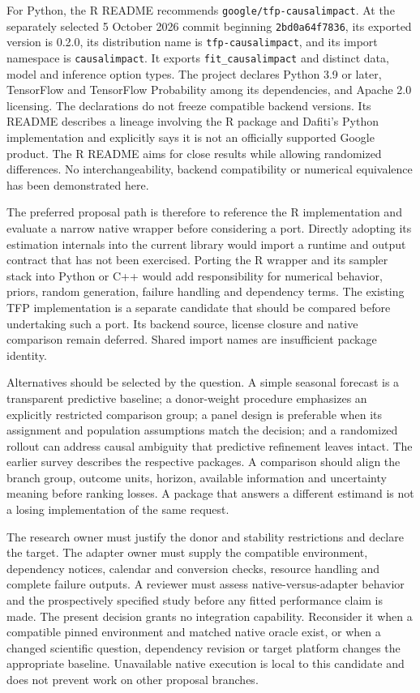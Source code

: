For Python, the R README recommends \texttt{google/tfp-causalimpact}.
At the separately selected 5 October 2026 commit beginning
\texttt{2bd0a64f7836}, its exported version is 0.2.0, its distribution name
is \texttt{tfp-causalimpact}, and its import namespace is
\texttt{causalimpact}. It exports \texttt{fit\_causalimpact} and distinct
data, model and inference option types. The project declares Python 3.9 or
later, TensorFlow and TensorFlow Probability among its dependencies, and
Apache 2.0 licensing. The declarations do not freeze compatible backend
versions. Its README describes a lineage involving the R package and Dafiti's
Python implementation and explicitly says it is not an officially supported
Google product. The R README aims for close results while allowing
randomized differences. No interchangeability, backend compatibility or
numerical equivalence has been demonstrated here.
\citep{exec13_ci_python,exec13_ci_r}

The preferred proposal path is therefore to reference the R implementation
and evaluate a narrow native wrapper before considering a port. Directly
adopting its estimation internals into the current library would import a
runtime and output contract that has not been exercised. Porting the R
wrapper and its sampler stack into Python or C++ would add responsibility
for numerical behavior, priors, random generation, failure handling and
dependency terms. The existing TFP implementation is a separate candidate
that should be compared before undertaking such a port. Its backend source,
license closure and native comparison remain deferred. Shared import names
are insufficient package identity. \citep{exec13_ci_reuse,exec13_ci_python}

Alternatives should be selected by the question. A simple seasonal forecast
is a transparent predictive baseline; a donor-weight procedure emphasizes
an explicitly restricted comparison group; a panel design is preferable
when its assignment and population assumptions match the decision; and a
randomized rollout can address causal ambiguity that predictive refinement
leaves intact. The earlier survey describes the respective packages. A
comparison should align the branch group, outcome units, horizon, available
information and uncertainty meaning before ranking losses. A package that
answers a different estimand is not a losing implementation of the same
request.

The research owner must justify the donor and stability restrictions and
declare the target. The adapter owner must supply the compatible environment,
dependency notices, calendar and conversion checks, resource handling and
complete failure outputs. A reviewer must assess native-versus-adapter
behavior and the prospectively specified study before any fitted performance
claim is made. The present decision grants no integration capability.
Reconsider it when a compatible pinned environment and matched native oracle
exist, or when a changed scientific question, dependency revision or target
platform changes the appropriate baseline. Unavailable native execution is
local to this candidate and does not prevent work on other proposal branches.
\citep{exec13_ci_reuse}
\label{exec13:causalimpact-reuse-end}


